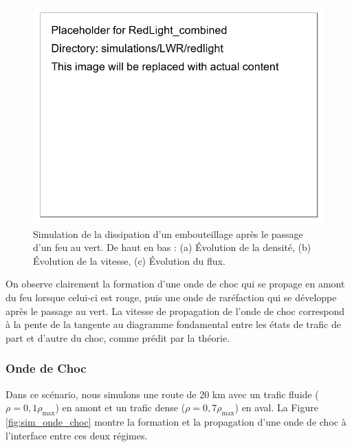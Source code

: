 \begin{figure}[htbp]
\centering
\includegraphics[width=1.0\textwidth]{simulations/LWR/redlight/RedLight_combined}
\caption{Simulation de la dissipation d'un embouteillage après le passage d'un feu au vert. De haut en bas : (a) Évolution de la densité, (b) Évolution de la vitesse, (c) Évolution du flux.}
\label{fig:feu_rouge}
\end{figure}

On observe clairement la formation d'une onde de choc qui se propage en amont du feu lorsque celui-ci est rouge, puis une onde de raréfaction qui se développe après le passage au vert. La vitesse de propagation de l'onde de choc correspond à la pente de la tangente au diagramme fondamental entre les états de trafic de part et d'autre du choc, comme prédit par la théorie.

\subsubsection{Onde de Choc}
\label{subsubsec:onde_choc_sim}

Dans ce scénario, nous simulons une route de 20 km avec un trafic fluide ($\rho = 0,1\rho_{\max}$) en amont et un trafic dense ($\rho = 0,7\rho_{\max}$) en aval. La Figure \ref{fig:sim_onde_choc} montre la formation et la propagation d'une onde de choc à l'interface entre ces deux régimes.

